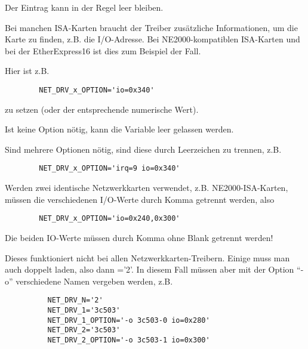 \begin{description}
    {Der Eintrag kann in der Regel leer bleiben.

    Bei manchen ISA-Karten braucht der Treiber zusätzliche
    Informationen, um die Karte zu finden, z.B. die I/O-Adresse. Bei
    NE2000-kompatiblen ISA-Karten und bei der EtherExpress16 ist dies
    zum Beispiel der Fall.

    Hier ist z.B.
    \begin{example}
    \begin{verbatim}
        NET_DRV_x_OPTION='io=0x340'
    \end{verbatim}
    \end{example}

    zu setzen (oder der entsprechende numerische Wert).

    Ist keine Option nötig, kann die Variable leer gelassen werden.

    Sind mehrere Optionen nötig, sind diese durch Leerzeichen zu trennen, z.B.
    \begin{example}
    \begin{verbatim}
        NET_DRV_x_OPTION='irq=9 io=0x340'
    \end{verbatim}
    \end{example}

    Werden zwei identische Netzwerkkarten verwendet, z.B.
    NE2000-ISA-Karten, müssen die verschiedenen I/O-Werte durch Komma
    getrennt werden, also

    \begin{example}
    \begin{verbatim}
        NET_DRV_x_OPTION='io=0x240,0x300'
    \end{verbatim}
    \end{example}

    Die beiden IO-Werte müssen durch Komma ohne Blank getrennt werden!

    Dieses funktioniert nicht bei allen Netzwerkkarten-Treibern.
    Einige muss man auch doppelt laden, also dann ='2'. In
    diesem Fall müssen aber mit der Option ``-o'' verschiedene Namen
    vergeben werden, z.B.

    \begin{example}
    \begin{verbatim}
          NET_DRV_N='2'
          NET_DRV_1='3c503'
          NET_DRV_1_OPTION='-o 3c503-0 io=0x280'
          NET_DRV_2='3c503'
          NET_DRV_2_OPTION='-o 3c503-1 io=0x300'
    \end{verbatim}
    \end{example}

}
\end{description}
